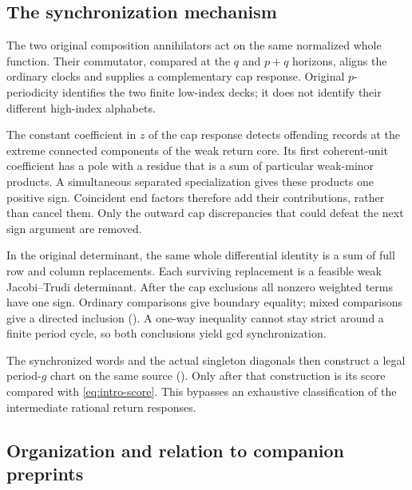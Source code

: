 \documentclass[11pt,a4paper]{amsart}
\numberwithin{equation}{section}
\theoremstyle{plain}
\theoremstyle{definition}
\begin{document}
\subsection{The synchronization mechanism}

The two original composition annihilators act
on the same normalized whole function.  Their commutator, compared at the
\(q\) and \(p+q\) horizons, aligns the ordinary clocks and supplies a complementary
cap response.  Original \(p\)-periodicity identifies the two finite low-index
decks; it does not identify their different high-index alphabets.

The constant coefficient in \(z\) of the cap response detects
offending records at the extreme
connected components of the weak return core.  Its first coherent-unit
coefficient has a pole with a residue that is a sum of particular weak-minor
products.  A simultaneous separated specialization gives these products one
positive sign.  Coincident end factors therefore add their contributions,
rather than cancel them.  Only the outward cap discrepancies that could defeat
the next sign argument are removed.

In the original determinant, the same whole differential
identity is a sum of full row and column replacements.  Each surviving
replacement is a feasible weak Jacobi--Trudi determinant.  After the cap
exclusions all nonzero weighted terms have one sign.  Ordinary comparisons give
boundary equality; mixed comparisons give a directed inclusion
().  A one-way
inequality cannot stay strict around a finite period cycle, so both conclusions
yield gcd synchronization.

The synchronized words and the actual singleton diagonals then construct a
legal period-\(g\) chart on the same source ().
Only after that construction is
its score compared with \eqref{eq:intro-score}.  This bypasses an exhaustive
classification of the intermediate rational return responses.

\subsection{Organization and relation to companion preprints}
\end{document}
